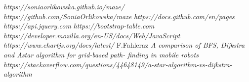 \begin{thebibliography}{100}
\emph{https://soniaorlikowska.github.io/maze/}
\emph{https://github.com/SoniaOrlikowska/maze}
 \emph{https://docs.github.com/en/pages}
\emph{https://api.jquery.com}
\emph{https://bootstrap-table.com}
\emph{https://developer.mozilla.org/en-US/docs/Web/JavaScript}
\emph{https://www.chartjs.org/docs/latest/}
F.Fahleraz \emph{A comparison of BFS, Dijkstra and Astar algorithm for grid-based path- finding in mobile robots}
\emph{https://stackoverflow.com/questions/44648149/a-star-algorithm-vs-dijkstra-algorithm}









\end{thebibliography}
